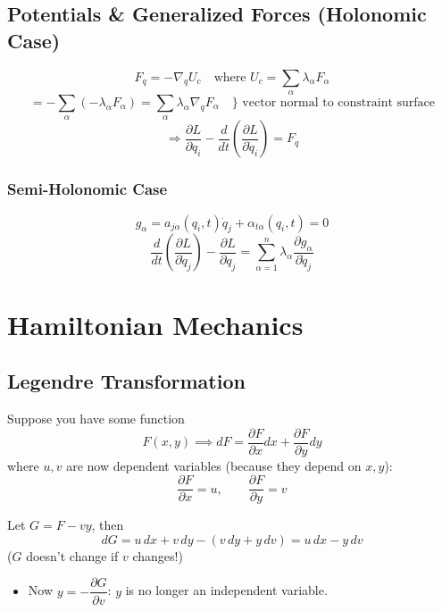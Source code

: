 \section{Potentials \& Generalized Forces (Holonomic Case)}

\[
    F_q = -\nabla_q U_c \quad \text{where } U_c = \sum_\alpha \lambda_\alpha F_\alpha
\]
\[
    = -\sum_\alpha(-\lambda_\alpha F_\alpha) = \sum_\alpha \lambda_\alpha \nabla_q F_\alpha \quad \} \text{ vector normal to constraint surface}
\]
\[
    \Rightarrow \frac{\partial L}{\partial q_i} - \frac{d}{dt}\!\left(\frac{\partial L}{\partial \dot{q}_i}\right) = F_q
\]

\subsection{Semi-Holonomic Case}

\[
    g_\alpha = a_{j\alpha}(q_i, t)\dot{q}_j + \alpha_{t\alpha}(q_i, t) = 0
\]
\[
    \frac{d}{dt}\!\left(\frac{\partial L}{\partial \dot{q}_j}\right) - \frac{\partial L}{\partial q_j} = \sum_{\alpha=1}^{n} \lambda_\alpha \frac{\partial g_\alpha}{\partial \dot{q}_j}
\]


\chapter{Hamiltonian Mechanics}

\section{Legendre Transformation}

Suppose you have some function
\[
    F(x,y) \implies dF = \frac{\partial F}{\partial x}dx + \frac{\partial F}{\partial y}dy
\]
where $u,v$ are now dependent variables (because they depend on $x,y$):
\[
    \frac{\partial F}{\partial x} = u, \qquad \frac{\partial F}{\partial y} = v
\]

\begin{definition}
Let $G = F - vy$, then
\[
    dG = u\,dx + v\,dy - (v\,dy + y\,dv) = u\,dx - y\,dv
\]
($G$ doesn't change if $v$ changes!)
\begin{itemize}
    \item Now $y = -\dfrac{\partial G}{\partial v}$: $y$ is no longer an independent variable.
\end{itemize}
\end{definition}

